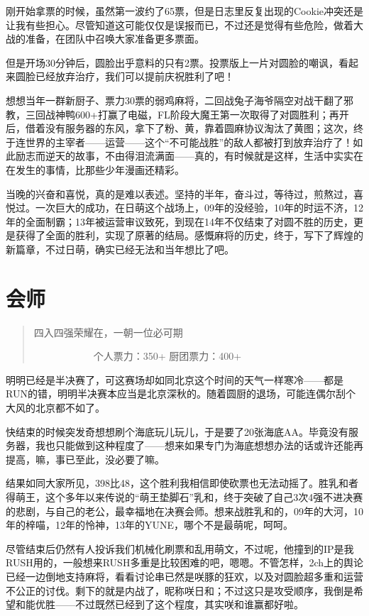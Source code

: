 刚开始拿票的时候，虽然第一波约了65票，但是日志里反复出现的Cookie冲突还是让我有些担心。尽管知道这可能仅仅是误报而已，不过还是觉得有些危险，做着大战的准备，在团队中召唤大家准备更多票面。

但是开场30分钟后，圆脸出乎意料的只有2票。投票版上一片对圆脸的嘲讽，看起来圆脸已经放弃治疗，我们可以提前庆祝胜利了吧！

想想当年一群新厨子、票力30票的弱鸡麻将，二回战兔子海爷隔空对战干翻了邪教，三回战神鸭600+打赢了电磁，FL阶段大魔王第一次取得了对圆胜利；再开后，借着没有服务器的东风，拿下了粉、黄，靠着圆麻协议淘汰了黄图；这次，终于连世界的主宰者——运营——这个“不可能战胜”的敌人都被打到放弃治疗了！如此励志而逆天的故事，不由得泪流满面——真的，有时候就是这样，生活中实实在在发生的事情，比那些少年漫画还精彩。

当晚的兴奋和喜悦，真的是难以表述。坚持的半年，奋斗过，等待过，煎熬过，喜悦过。一次巨大的成功，在日萌这个战场上，09年的没经验，10年的时运不济，12年的全面制霸；13年被运营审议致死，到现在14年不仅结束了对圆不胜的历史，更是获得了全面的胜利，实现了原著的结局。感慨麻将的历史，终于，写下了辉煌的新篇章，不过日萌，确实已经无法和当年想比了吧。


\section{会师}
\begin{quote}
四入四强荣耀在，一朝一位必可期

　　　　　　个人票力：350+ 厨团票力：400+
\end{quote}

明明已经是半决赛了，可这赛场却如同北京这个时间的天气一样寒冷——都是RUN的错，明明半决赛本应当是北京深秋的。随着圆厨的退场，可能连偶尔刮个大风的北京都不如了。

快结束的时候突发奇想想刷个海底玩儿玩儿，于是要了20张海底AA。毕竟没有服务器，我也只能做到这种程度了——想来如果专门为海底想想办法的话或许还能再提高，嘛，事已至此，没必要了嘛。

结果如同大家所见，398比48，这个胜利我相信即使砍票也无法动摇了。胜乳和者得萌王，这个多年以来传说的“萌王垫脚石”乳和，终于突破了自己3次4强不进决赛的悲剧，与自己的老公，最幸福地在决赛会师。想来战胜乳和的，09年的大河，10年的梓喵，12年的怜神，13年的YUNE，哪个不是最萌呢，呵呵。

尽管结束后仍然有人投诉我们机械化刷票和乱用萌文，不过呢，他撞到的IP是我RUSH用的，一般想来RUSH多重是比较困难的吧，嗯嗯。不管怎样，2ch上的舆论已经一边倒地支持麻将，看看讨论串已然是咲豚的狂欢，以及对圆脸超多重和运营不公正的讨伐。剩下的就是内战了，昵称咲日和；不过这只是攻受顺序，我倒是希望和能优胜——不过既然已经到了这个程度，其实咲和谁赢都好啦。

